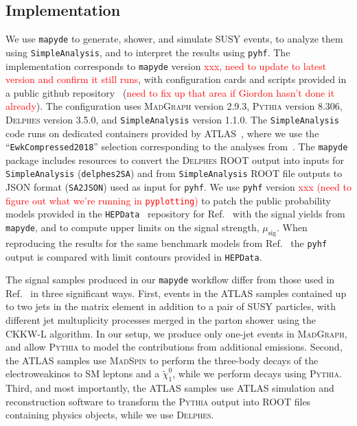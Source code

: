 \documentclass{article}
\newcommand{\chioz}{\ensuremath{\widetilde{\chi}_{1}^{0}}}
\newcommand{\mapyde}{\texttt{mapyde}}
\newcommand{\simpleanalysis}{\texttt{SimpleAnalysis}}
\newcommand{\madgraph}{\textsc{MadGraph}}
\newcommand{\madspin}{\textsc{MadSpin}}
\newcommand{\pythia}{\textsc{Pythia}}
\newcommand{\delphes}{\textsc{Delphes}}
\newcommand{\pyhf}{\texttt{pyhf}}
\newcommand{\musig}{\ensuremath{\mu_{\mathrm{sig}}}}
\newcommand{\hepdata}{\texttt{HEPData}}
\begin{document}
\subsection{Implementation}
\label{ssec:implementation}

We use \mapyde{} to generate, shower, and simulate SUSY events, to analyze them using \simpleanalysis, and to interpret the results using \pyhf.  The implementation corresponds to \mapyde{} version \textcolor{red}{xxx, need to update to latest version and confirm it still runs}, with configuration cards and scripts provided in a public github repository~\cite{mapyde-user} (\textcolor{red}{need to fix up that area if Giordon hasn't done it already}).  The configuration uses \madgraph{} version 2.9.3, \pythia{} version 8.306, \delphes{} version 3.5.0, and \simpleanalysis{} version 1.1.0.  The \simpleanalysis{} code runs on dedicated containers provided by ATLAS~\cite{SAGitLabRegistry}, where we use the \enquote{\texttt{EwkCompressed2018}} selection corresponding to the analyses from~\cite{ATLAS:2019lng}.  The \mapyde{} package includes resources to convert the \delphes{} ROOT output into inputs for \simpleanalysis{} (\texttt{delphes2SA}) and from \simpleanalysis{} ROOT file outputs to JSON format (\texttt{SA2JSON}) used as input for \pyhf.  We use \pyhf{} version \textcolor{red}{xxx (need to figure out what we're running in \texttt{pyplotting})} to patch the public probability models provided in the \hepdata~\cite{HepData} repository for Ref.~\cite{ATLAS:2019lng} with the signal yields from \mapyde, and to compute upper limits on the signal strength, \musig.  When reproducing the results for the same benchmark models from Ref.~\cite{ATLAS:2019lng} the \pyhf{} output is compared with limit contours provided in \hepdata.

The signal samples produced in our \mapyde{} workflow differ from those used in Ref.~\cite{ATLAS:2019lng} in three significant ways.  First, events in the ATLAS samples contained up to two jets in the matrix element in addition to a pair of SUSY particles, with different jet multuplicity processes merged in the parton shower using the CKKW-L algorithm.  In our setup, we produce only one-jet events in \madgraph, and allow \pythia{} to model the contributions from additional emissions.  Second, the ATLAS samples use \madspin{} to perform the three-body decays of the electroweakinos to SM leptons and a \chioz, while we perform decays using \pythia.  Third, and most importantly, the ATLAS samples use ATLAS simulation and reconstruction software to transform the \pythia{} output into ROOT files containing physics objects, while we use \delphes.
\end{document}
